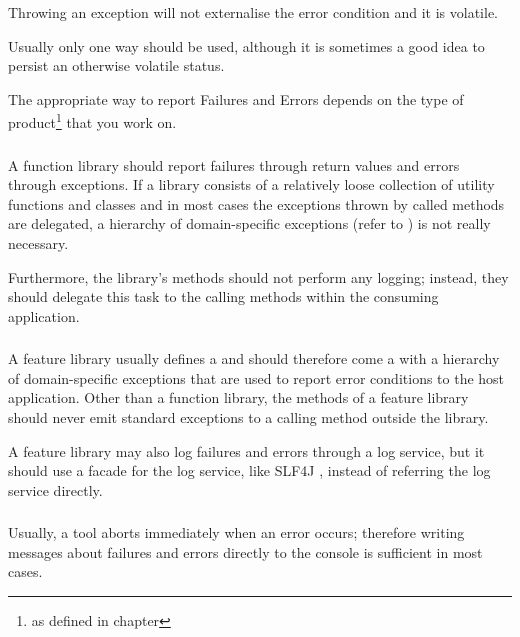 Throwing an exception will not externalise the error condition and it is volatile.

\bigskip

Usually only one way should be used, although it is sometimes a good idea to persist an otherwise volatile status.

The appropriate way to report Failures and Errors depends on the type of product\footnote{as defined in chapter } that you work on.

\subsubsection{}
A function library should report failures through return values and errors through exceptions. If a library consists of a relatively loose collection of utility functions and classes and in most cases the exceptions thrown by called methods are delegated, a hierarchy of domain-specific exceptions (refer to ) is not really necessary.

Furthermore, the library's methods should not perform any logging; instead, they should delegate this task to the calling methods within the consuming application.

\subsubsection{}
A feature library usually defines a  and should therefore come a with a hierarchy of domain-specific exceptions that are used to report error conditions to the host application. Other than a function library, the methods of a feature library should never emit standard exceptions to a calling method outside the library.

A feature library may also log failures and errors through a log service, but it should use a facade for the log service, like SLF4J \autocite{SLF4J}, instead of referring the log service directly.

\subsubsection{}
Usually, a tool aborts immediately when an error occurs; therefore writing messages about failures and errors directly to the console is sufficient in most cases.

